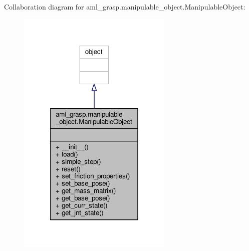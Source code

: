 Collaboration diagram for aml\-\_\-grasp.\-manipulable\-\_\-object.\-Manipulable\-Object\-:
\nopagebreak
\begin{figure}[H]
\begin{center}
\leavevmode
\includegraphics[width=210pt]{classaml__grasp_1_1manipulable__object_1_1_manipulable_object__coll__graph}
\end{center}
\end{figure}
